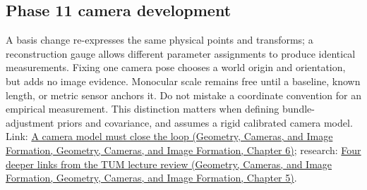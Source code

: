 \subsection{Phase 11 camera development}\label{appendix-1bae9457dbc3-phase-11-camera-development}

A basis change re-expresses the same physical points and transforms; a reconstruction gauge allows different parameter assignments to produce identical measurements. Fixing one camera pose chooses a world origin and orientation, but adds no image evidence. Monocular scale remains free until a baseline, known length, or metric sensor anchors it. Do not mistake a coordinate convention for an empirical measurement. This distinction matters when defining bundle-adjustment priors and covariance, and assumes a rigid calibrated camera model. Link: \href{../03-Geometry-Cameras-and-Image-Formation/main.pdf\#nameddest=02-foundations-ii-ch037-a-camera-model-must-close-the-loop}{A camera model must close the loop (Geometry, Cameras, and Image Formation, Geometry, Cameras, and Image Formation, Chapter 6)}; research: \href{../03-Geometry-Cameras-and-Image-Formation/main.pdf\#nameddest=02-foundations-ii-ch036-four-deeper-links-from-the-tum-lecture-review}{Four deeper links from the TUM lecture review (Geometry, Cameras, and Image Formation, Geometry, Cameras, and Image Formation, Chapter 5)}.
